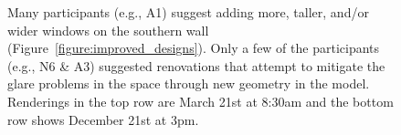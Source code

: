 \begin{figure}[t]
\vspace{1.7in}

\caption{
Many
  participants (e.g., A1) suggest adding more, taller, and/or wider
  windows on the southern wall (Figure~\ref{figure:improved_designs}).
Only a few of the participants (e.g., N6 \& A3)
  suggested renovations that attempt to mitigate the glare problems in
  the space through new geometry in the model.  
  Renderings in
  the top row are March 21st at 8:30am and the bottom row shows
  December 21st at 3pm.}
\label{figure:renovations}

\vspace{-0.1in}
\end{figure}
